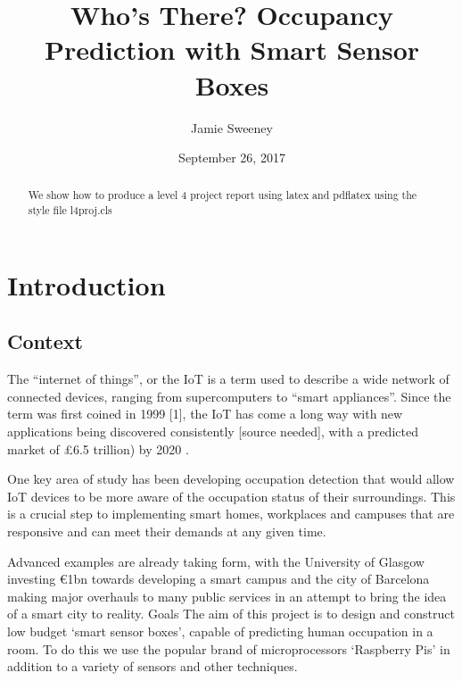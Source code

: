 \documentclass{l4proj}
\begin{document}
\title{Who's There? Occupancy Prediction with Smart Sensor Boxes}
\author{Jamie Sweeney}
\date{September 26, 2017}
\maketitle

\begin{abstract}
We show how to produce a level 4 project report using latex and pdflatex using the 
style file l4proj.cls
\end{abstract}

\educationalconsent
%
%
\tableofcontents


\chapter{Introduction}


\section{Context}
The “internet of things”, or the IoT is a term used to describe a wide network of connected devices, ranging from supercomputers to “smart appliances”. Since the term was first coined in 1999 [1], the IoT has come a long way with new applications being discovered consistently [source needed], with a predicted market of £6.5 trillion) by 2020 \cite{test}.

One key area of study has been developing occupation detection that would allow IoT devices to be more aware of the occupation status of their surroundings. This is a crucial step to implementing smart homes, workplaces and campuses that are responsive and can meet their demands at any given time.

Advanced examples are already taking form, with the University of Glasgow investing €1bn towards developing a smart campus and the city of Barcelona making major overhauls to many public services in an attempt to bring the idea of a smart city to reality.
Goals
The aim of this project is to design and construct low budget ‘smart sensor boxes’, capable of predicting human occupation in a room. To do this we use the popular brand of microprocessors ‘Raspberry Pis’ in addition to a variety of sensors and other techniques.
\end{document}
